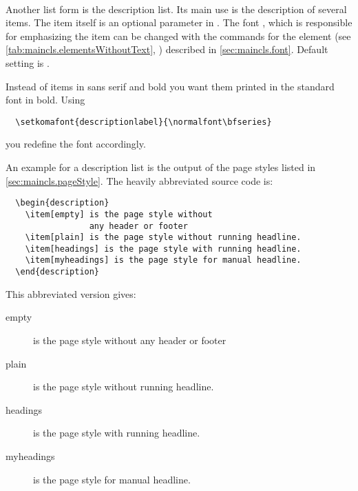 \begin{Declaration}
  \\
\end{Declaration}%
%
%
Another list form is the description list. Its main use is the
description of several items. The item itself is an optional parameter
in . The font%
, which is responsible for emphasizing the item can be changed with
the commands for the element
 (see
\autoref{tab:maincls.elementsWithoutText},
) described in
\autoref{sec:maincls.font}. Default setting is
.
\begin{Example}
  Instead of items in sans serif and bold you want them printed in the
  standard font in bold. Using
\begin{lstlisting}
  \setkomafont{descriptionlabel}{\normalfont\bfseries}
\end{lstlisting}
  you redefine the font accordingly.

  An example for a description list is the output of the page styles
  listed in \autoref{sec:maincls.pageStyle}. The heavily
  abbreviated source code is:
\begin{lstlisting}
  \begin{description}
    \item[empty] is the page style without
                 any header or footer
    \item[plain] is the page style without running headline.
    \item[headings] is the page style with running headline.
    \item[myheadings] is the page style for manual headline.
  \end{description}
\end{lstlisting}
  This abbreviated version gives:
  \begin{ShowOutput}
    \begin{description}
    \item[empty] is the page style without any header or footer
    \item[plain] is the page style without running headline.
    \item[headings] is the page style with running headline.
    \item[myheadings] is the page style for manual headline.
    \end{description}
  \end{ShowOutput}
\end{Example}
%
%
%


